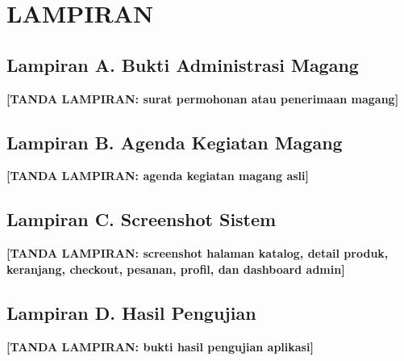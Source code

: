\documentclass[12pt,a4paper,oneside]{report}
\newcommand{\placeholder}[1]{\textbf{[#1]}}
\begin{document}
\clearpage



\appendix
\chapter{LAMPIRAN}

\section*{Lampiran A. Bukti Administrasi Magang}

\placeholder{TANDA LAMPIRAN: surat permohonan atau penerimaan magang}

\section*{Lampiran B. Agenda Kegiatan Magang}

\placeholder{TANDA LAMPIRAN: agenda kegiatan magang asli}

\section*{Lampiran C. Screenshot Sistem}

\placeholder{TANDA LAMPIRAN: screenshot halaman katalog, detail produk, keranjang, checkout, pesanan, profil, dan dashboard admin}

\section*{Lampiran D. Hasil Pengujian}

\placeholder{TANDA LAMPIRAN: bukti hasil pengujian aplikasi}
\end{document}
